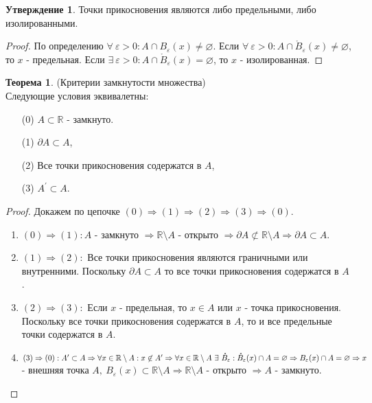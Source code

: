 \documentclass[a4paper, 12pt]{article}
\newcommand{\R}{\mathbb{R}}
\renewcommand{\epsilon}{\varepsilon}
\renewcommand{\emptyset}{\varnothing}
\theoremstyle{definition}
\newtheorem*{theorem}{Теорема}
\newtheorem*{statement}{Утверждение}
\begin{document}
        \begin{statement}
            Точки прикосновения являются либо предельными, либо изолированными.
        \end{statement}  
        \begin{proof}
            По определению $\forall \ \epsilon>0: A\cap B_{\epsilon}(x)\ne\emptyset$. Если $\forall \ \epsilon>0: A\cap \mathring{B}_{\epsilon}(x)\ne\emptyset$, то $x$ - предельная. Если $\exists\ \epsilon > 0: A\cap\mathring{B}_{\epsilon}(x)=\emptyset$, то $x$ - изолированная.
        \end{proof} 
        \begin{theorem} (Критерии замкнутости множества)\\
            Следующие условия эквивалетны:
            \begin{itemize}
                \item[(0)] $A\subset \R$ - замкнуто. 
                \item[(1)] $\partial A\subset A$,
                \item[(2)] Все точки прикосновения содержатся в $A$,
                \item[(3)] $A^{\prime}\subset A$.
            \end{itemize}
            \begin{proof}
                Докажем по цепочке $(0)\Rightarrow (1)\Rightarrow (2)\Rightarrow (3)\Rightarrow (0)$.
                \begin{enumerate}
                    \item $(0)\Rightarrow (1):A$ - замкнуто $\Rightarrow \R\setminus A$ - открыто $\Rightarrow \partial A \not\subset\R\setminus A \Rightarrow \partial A\subset A$.
                    \item $(1)\Rightarrow (2):$ Все точки прикосновения являются граничными или внутренними. Поскольку $\partial A\subset A$ то все точки прикосновения содержатся в $A$.
                    \item $(2)\Rightarrow (3):$ Если $x$ - предельная, то $x\in A$ или $x$ - точка прикосновения. Поскольку все точки прикосновения содержатся в $A$, то и все предельные точки содержатся в $A$.
                    \item $(3)\Rightarrow (0): A^{\prime}\subset A\Rightarrow \forall x\in \R\setminus A: x\not\in A^{\prime}\Rightarrow \forall x\in\R\setminus A\ \exists\ \mathring{B}_{\epsilon}: \mathring{B}_{\epsilon}(x)\cap A=\emptyset\\
                    \Rightarrow B_{\epsilon}(x)\cap A=\emptyset \Rightarrow x$ - внешняя точка $A,\ B_{\epsilon}(x)\subset\R\setminus A\Rightarrow \R\setminus A$ - открыто $\Rightarrow A$ - замкнуто. 
                \end{enumerate}
            \end{proof}
        \end{theorem}
\end{document}
